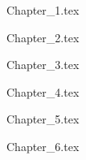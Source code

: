 \documentclass[a4paper,oneside]{book}
\begin{document}
\tableofcontents

 {Chapter_1.tex}

 {Chapter_2.tex}

 {Chapter_3.tex}

 {Chapter_4.tex}

 {Chapter_5.tex}

 {Chapter_6.tex}

%

\end{document}
